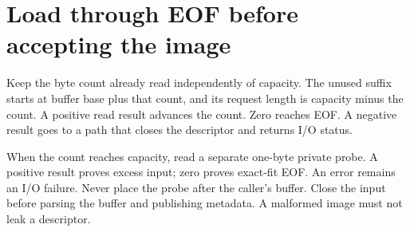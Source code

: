 \section{Load through EOF before accepting the image}
Keep the byte count already read independently of capacity. The unused suffix starts
at buffer base plus that count, and its request length is capacity minus the count.
A positive read result advances the count. Zero reaches EOF. A negative result goes to
a path that closes the descriptor and returns I/O status.

When the count reaches capacity, read a separate one-byte private probe. A positive
result proves excess input; zero proves exact-fit EOF. An error remains an I/O failure.
Never place the probe after the caller's buffer. Close the input before parsing the
buffer and publishing metadata. A malformed image must not leak a descriptor.
